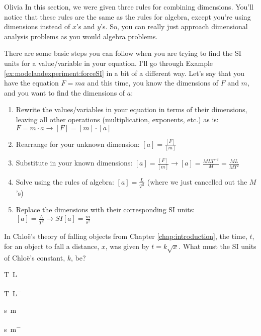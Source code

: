 \begin{studentOpinion}{Olivia}
In this section, we were given three rules for combining dimensions. You'll notice that these rules are the same as the rules for algebra, except you're using dimensions instead of $x$'s and $y$'s. So, you can really just approach dimensional analysis problems as you would algebra problems.

There are some basic steps you can follow when you are trying to find the SI units for a value/variable in your equation. I'll go through Example \ref{ex:modelandexperiment:forceSI} in a bit of a different way. Let's say that you have the equation $F=ma$ and this time, you know the dimensions of $F$ and $m$, and you want to find the dimensions of $a$:
\begin{enumerate}[itemsep=1ex]
\item Rewrite the values/variables in your equation in terms of their dimensions, leaving all other operations (multiplication, exponents, etc.) as is: $F=m\cdot a\rightarrow [F]=[m]\cdot[a]$
\item Rearrange for your unknown dimension: $[a]=\frac{[F]}{[m]}$
\item Substitute in your known dimensions: $[a]=\frac{[F]}{[m]} \rightarrow [a]=\frac{MLT^{-2}}{M}=\frac{ML}{MT^2}$
\item Solve using the rules of algebra: $[a]=\frac{L}{T^2}$ (where we just cancelled out the $M$'s)
\item Replace the dimensions with their corresponding SI units: $[a]=\frac{L}{T^2}\rightarrow SI[a]=\frac{m}{s^2}$
\end{enumerate}
\end{studentOpinion}

\begin{checkpoint}
\begin{MCquestion}{In Chlo\"e's theory of falling objects from Chapter \ref{chap:introduction}, the time, $t$, for an object to fall a distance, $x$, was given by $t=k\sqrt{x}$. What must the SI units of Chlo\"e's constant, $k$, be?}
\item \si{T.L^{}}
\item \si{T.L^{-}}
\item \si{s.m^{}}
\item \si{s.m^{-}} \correct
\end{MCquestion}
\end{checkpoint}

